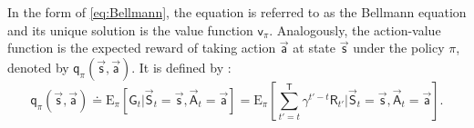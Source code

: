 In the form of \eqref{eq:Bellmann}, the equation is referred to as the Bellmann equation and its unique solution is the value function $\mathsf{v}_\pi$. Analogously, the action-value function is the expected reward of taking action $\vec{\mathsf{a}}$ at state $\vec{\mathsf{s}}$ under the policy $\pi$, denoted by $\mathsf{q}_\pi(\vec{\mathsf{s}},\vec{\mathsf{a}})$. It is defined by \cite[p. 58-59]{sutton_reinforcement_2018}:
\begin{equation}
	\mathsf{q}_\pi(\vec{\mathsf{s}},\vec{\mathsf{a}}) \doteq \mathrm{E}_\pi \left[ \mathsf{G}_t \vert \vec{\mathsf{S}}_t=\vec{\mathsf{s}}, \vec{\mathsf{A}}_t=\vec{\mathsf{a}} \right] =
	\mathrm{E}_\pi \left[\sum_{t'=t}^{\mathsf{T}}\gamma^{t'-t} \mathsf{R}_{t'} \vert \vec{\mathsf{S}}_t=\vec{\mathsf{s}}, \vec{\mathsf{A}}_t=\vec{\mathsf{a}}\right]. \label{eq:action_value_func}
\end{equation}
